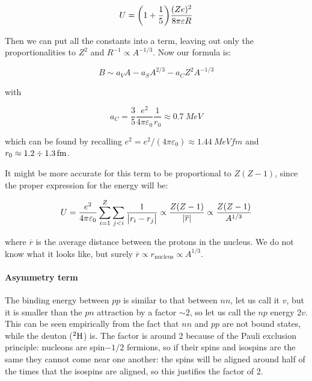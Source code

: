 \documentclass{article}
\begin{document}
\begin{equation}
    U = \qty(1 + \frac{1}{5}) \frac{(Ze)^2}{8 \pi \varepsilon R}
\end{equation}

Then we can put all the constants into a term, leaving out only the proportionalities to \(Z^2\) and \(R^{-1} \propto A^{-1/3}\). Now our formula is:

\begin{equation}
    B \sim a_V A - a_S A ^{2/3} - a_C Z^2 A ^{-1/3}
\end{equation}

with

\begin{equation}
    a_C = \frac{3}{5} \frac{e^2}{4 \pi \varepsilon_0} \frac{1}{r_0} \approx \SI{0.7}{MeV}
\end{equation}

which can be found by recalling \(e^2 = e^2 / (4 \pi \varepsilon_0) \approx \SI{1.44}{MeV fm} \) and \(r_0 \approx 1.2 \divisionsymbol \SI{1.3}{fm} \).

It might be more accurate for this term to be proportional to \(Z(Z-1)\), since the proper expression for the energy will be:

\begin{equation} \label{eq:SEMF-coulomb-correction}
    U = \frac{e^2}{4 \pi \varepsilon_0} \sum _{i=1}   ^{Z} \sum _{j<i} \frac{1}{\abs{r_i - r_j} }  \propto \frac{Z(Z-1)}{\abs{\overline{r} } }  \propto \frac{Z(Z-1)}{A^{1/3}}
\end{equation}

where \(\overline{r} \) is the average distance between the protons in the nucleus. We do not know what it looks like, but surely \(\overline{r} \propto r _{\text{nucleus}}  \propto A^{1/3}\).

\paragraph{Asymmetry term}

The binding energy between \(pp\) is similar to that between \(nn\), let us call it \(v\), but it is smaller than the \(pn\) attraction by a factor \(\sim 2\), so let us call the \(np\) energy \(2v\). This can be seen empirically from the fact that \(nn\) and \(pp\) are not bound states, while the deuton (\(^{2} \ce{H} \)) is.
The factor is around 2 because of the Pauli exclusion principle: nucleons are spin\(-1/2\) fermions, so if their spins and isospins are the same they cannot come near one another: the spins will be aligned around half of the times that the isospins are aligned, so this justifies the factor of 2.
\end{document}
